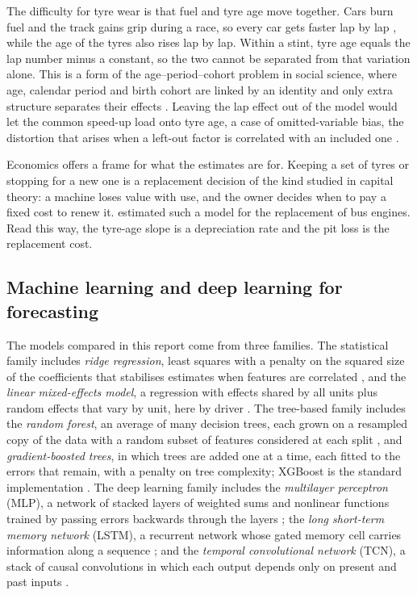\documentclass[12pt]{article}
\begin{document}
The difficulty for tyre wear is that fuel and tyre age move together. Cars burn fuel and the track gains grip during a
race, so every car gets faster lap by lap \parencite{heilmeier2018}, while the age of the tyres also rises lap by lap.
Within a stint, tyre age equals the lap number minus a constant, so the two cannot be separated from that variation alone.
This is a form of the age--period--cohort problem in social science, where age, calendar period and birth cohort are
linked by an identity and only extra structure separates their effects \parencite{fosse2019}. Leaving the lap effect
out of the model would let the common speed-up load onto tyre age, a case of omitted-variable bias, the distortion that
arises when a left-out factor is correlated with an included one \parencite[ch.~3]{angrist2009}.

Economics offers a frame for what the estimates are for. Keeping a set of tyres or stopping for a new one is a
replacement decision of the kind studied in capital theory: a machine loses value with use, and the owner decides when to
pay a fixed cost to renew it. \textcite{rust1987} estimated such a model for the replacement of bus engines. Read this
way, the tyre-age slope is a depreciation rate and the pit loss is the replacement cost.

\subsection{Machine learning and deep learning for forecasting}\label{sec:lit-ml}

The models compared in this report come from three families. The statistical family includes \emph{ridge regression},
least squares with a penalty on the squared size of the coefficients that stabilises estimates when features are
correlated \parencite{hoerl1970}, and the \emph{linear mixed-effects model}, a regression with effects shared by all
units plus random effects that vary by unit, here by driver \parencite{laird1982}. The tree-based family includes the
\emph{random forest}, an average of many decision trees, each grown on a resampled copy of the data with a random subset
of features considered at each split \parencite{breiman2001}, and \emph{gradient-boosted trees}, in which trees are added
one at a time, each fitted to the errors that remain, with a penalty on tree complexity; XGBoost is the standard
implementation \parencite{chen2016}. The deep learning family includes the \emph{multilayer perceptron} (MLP), a network
of stacked layers of weighted sums and nonlinear functions trained by passing errors backwards through the layers
\parencite{rumelhart1986}; the \emph{long short-term memory network} (LSTM), a recurrent network whose gated memory cell
carries information along a sequence \parencite{hochreiter1997}; and the \emph{temporal convolutional network} (TCN), a
stack of causal convolutions in which each output depends only on present and past inputs \parencite{bai2018}.
\end{document}
